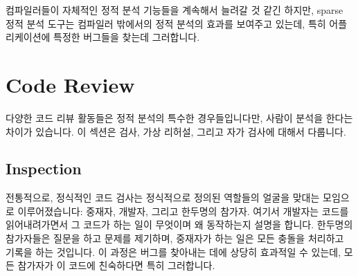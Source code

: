 컴파일러들이 자체적인 정적 분석 기능들을 계속해서 늘려갈 것 같긴 하지만, sparse
정적 분석 도구는 컴파일러 밖에서의 정적 분석의 효과를 보여주고 있는데, 특히
어플리케이션에 특정한 버그들을 찾는데 그러합니다.

\section{Code Review}
\label{sec:debugging:Code Review}

다양한 코드 리뷰 활동들은 정적 분석의 특수한 경우들입니다만, 사람이 분석을
한다는 차이가 있습니다.
이 섹션은 검사, 가상 리허설, 그리고 자가 검사에 대해서 다룹니다.

\subsection{Inspection}
\label{sec:debugging:Inspection}

전통적으로, 정식적인 코드 검사는 정식적으로 정의된 역할들의 얼굴을 맞대는
모임으로 이루어졌습니다: 중재자, 개발자, 그리고 한두명의 참가자.
여기서 개발자는 코드를 읽어내려가면서 그 코드가 하는 일이 무엇이며 왜
동작하는지 설명을 합니다.
한두명의 참가자들은 질문을 하고 문제를 제기하며, 중재자가 하는 일은 모든 충돌을
처리하고 기록을 하는 것입니다.
이 과정은 버그를 찾아내는 데에 상당히 효과적일 수 있는데, 모든 참가자가 이
코드에 친숙하다면 특히 그러합니다.

